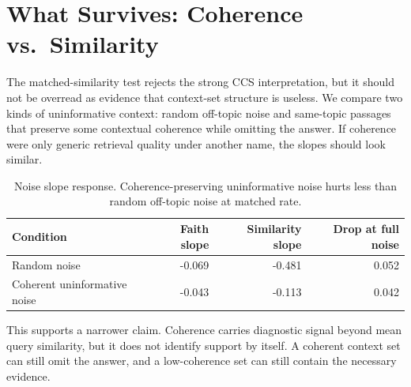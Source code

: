 \section{What Survives: Coherence vs.\ Similarity}
\label{sec:coherence_survives}

The matched-similarity test rejects the strong CCS interpretation, but it
should not be overread as evidence that context-set structure is useless. We
compare two kinds of uninformative context: random off-topic noise and
same-topic passages that preserve some contextual coherence while omitting the
answer. If coherence were only generic retrieval quality under another name,
the slopes should look similar.

\begin{table}[H]
\centering
\small
\caption{Noise slope response. Coherence-preserving uninformative noise hurts
less than random off-topic noise at matched rate.}
\label{tab:noise}
\begin{tabular}{lrrr}
\toprule
Condition & Faith slope & Similarity slope & Drop at full noise \\
\midrule
Random noise & -0.069 & -0.481 & 0.052 \\
Coherent uninformative noise & -0.043 & -0.113 & 0.042 \\
\bottomrule
\end{tabular}
\end{table}

This supports a narrower claim. Coherence carries diagnostic signal beyond
mean query similarity, but it does not identify support by itself. A coherent
context set can still omit the answer, and a low-coherence set can still
contain the necessary evidence.
